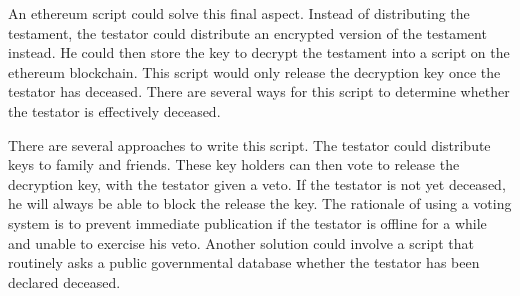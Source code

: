 An ethereum script could solve this final aspect. Instead of distributing the testament, the testator could distribute an encrypted version of the testament instead. He could then store the key to decrypt the testament into a script on the ethereum blockchain. This script would only release the decryption key once the testator has deceased. There are several ways for this script to determine whether the testator is effectively deceased. 

There are several approaches to write this script. The testator could distribute keys to family and friends. These key holders can then vote to release the decryption key, with the testator given a veto. If the testator is not yet deceased, he will always be able to block the release the key. The rationale of using a voting system is to prevent immediate publication if the testator is offline for a while and unable to exercise his veto. Another solution could involve a script that routinely asks a public governmental database whether the testator has been declared deceased.
